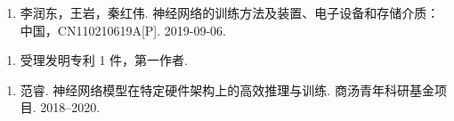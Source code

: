 \documentclass[
  fontset = mac,
]{shtthesis}
\begin{document}
\begin{patterns}
\begin{enumerate}
  \item 李润东，王岩，秦红伟. 神经网络的训练方法及装置、电子设备和存储介质：中国，CN110210619A[P]. 2019-09-06.
\end{enumerate}
\end{patterns}

\begin{patterns*}
\begin{enumerate}
  \item 受理发明专利 1 件，第一作者.
\end{enumerate}
\end{patterns*}

\begin{projects}
\begin{enumerate}
  \item 范睿. 神经网络模型在特定硬件架构上的高效推理与训练. 商汤青年科研基金项目. 2018--2020.
\end{enumerate}
\end{projects}
\end{document}
